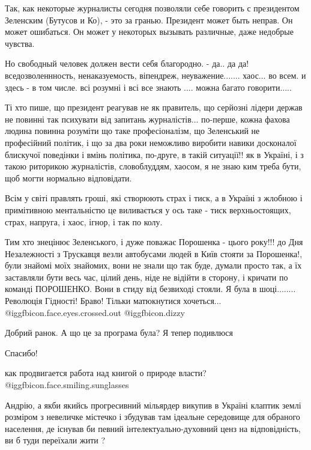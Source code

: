 \begin{itemize}

Так, как некоторые журналисты сегодня позволяли себе говорить с президентом
Зеленским (Бутусов и Ко), - это за гранью. Президент может быть неправ. Он
может ошибаться. Он может у некоторых вызывать различные, даже недобрые
чувства.

Но свободный человек должен вести себя благородно. - да.. да да!
вседозволеннность, ненаказуемость, віпендреж, неуважение....... хаос... во
всем. и здесь - в том числе. всі розумні і всі все знають .... можна багато
говорити.....


Ті хто пише, що президент реагував не як правитель, що серйозні лідери держав
не повинні так психувати від запитань журналістів... по-перше, кожна фахова
людина повинна розуміти що таке професіоналізм, що Зеленський не професійний
політик, і що за два роки неможливо виробити навики досконалої блискучої
поведінки і вмінь політика, по-друге, в такій ситуації!! як в Україні, і з
такою риторикою журналістів, словоблуддям, хаосом, я не знаю ким треба бути,
щоб могти нормально відповідати.

Всім у світі правлять гроші, які створюють страх і тиск, а в Україні з жлобною
і примітивною ментальністю це виливається у ось таке - тиск верхньостоящих,
страх, напруга, і хаос, ігнор, і так по колу.

Тим хто знецінює Зеленського, і дуже поважає Порошенка - цього року!!! до Дня
Незалежності з Трускавця везли автобусами людей в Київ стояти за Порошенка!,
були знайомі моїх знайомих, вони не знали що так буде, думали просто так, а їх
заставляли бути весь час, цілий день, ніде не відійти в сторону, і кричати по
команді ПОРОШЕНКО. Вони в стиду від безвиході стояли. Я була в шоці........
Революція Гідності! Браво! Тільки матюкнутися хочеться...  @igg{fbicon.face.eyes.crossed.out}  @igg{fbicon.dizzy} 

Добрий ранок. А що це за програма була? Я тепер подивлюся

Спасибо!

как продвигается работа над книгой о природе власти?  @igg{fbicon.face.smiling.sunglasses} 


Андрію, а якби якийсь прогресивний мільярдер викупив в Україні клаптик землі
розміром з невеличке містечко і збудував там ідеальне середовище для обраного
населення, де існував би певний інтелектуально-духовний ценз на відповідність,
ви б туди переїхали жити ?


\end{itemize}
